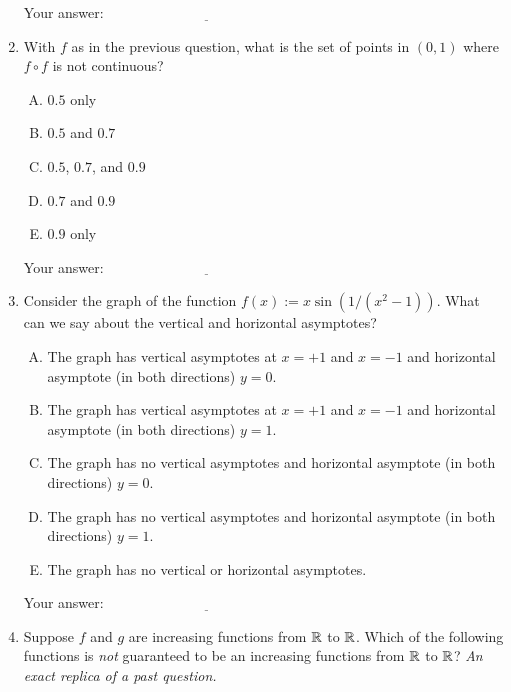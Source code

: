 \documentclass[10pt]{amsart}
\begin{document}
\begin{enumerate}
  
\vspace{0.05in}
  Your answer: $\underline{\qquad\qquad\qquad\qquad\qquad\qquad\qquad}$
\vspace{0.05in}
  



\item With $f$ as in the previous question, what is the set of points
  in $(0,1)$ where $f \circ f$ is not continuous?

  \begin{enumerate}[(A)]
  \item $0.5$ only
  \item $0.5$ and $0.7$
  \item $0.5$, $0.7$, and $0.9$
  \item $0.7$ and $0.9$
  \item $0.9$ only
  \end{enumerate}

  
\vspace{0.05in}
  Your answer: $\underline{\qquad\qquad\qquad\qquad\qquad\qquad\qquad}$
\vspace{0.05in}
  

\item Consider the graph of the function $f(x) := x\sin(1/(x^2 -
  1))$. What can we say about the vertical and horizontal asymptotes?
  

  \begin{enumerate}[(A)]
  \item The graph has vertical asymptotes at $x = +1$ and $x = -1$
    and horizontal asymptote (in both directions) $y = 0$.
  \item The graph has vertical asymptotes at $x = +1$ and $x = -1$
    and horizontal asymptote (in both directions) $y = 1$.
  \item The graph has no vertical asymptotes and horizontal
    asymptote (in both directions) $y = 0$.
  \item The graph has no vertical asymptotes and horizontal
    asymptote (in both directions) $y = 1$.
  \item The graph has no vertical or horizontal asymptotes.
  \end{enumerate}

  
\vspace{0.05in}
  Your answer: $\underline{\qquad\qquad\qquad\qquad\qquad\qquad\qquad}$
\vspace{0.05in}
  

\item Suppose $f$ and $g$ are increasing functions from $\mathbb{R}$ to
  $\mathbb{R}$. Which of the following functions is {\em not} guaranteed to be
  an increasing functions from $\mathbb{R}$ to $\mathbb{R}$? {\em An exact replica of
  a past question.}


\end{enumerate}
\end{document}
